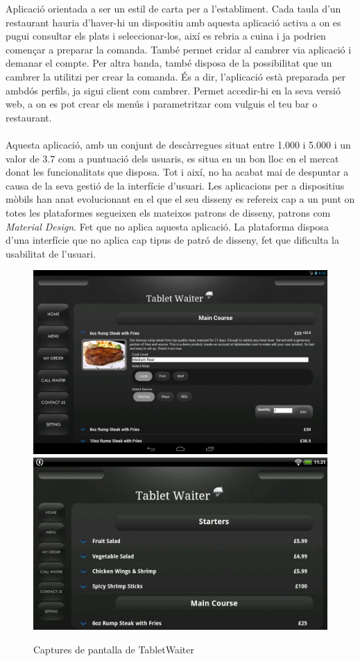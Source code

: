 Aplicació\cite{tabletwaiter} orientada a ser un estil de carta per a l'establiment. Cada taula d'un restaurant hauria d'haver-hi un dispositiu amb aquesta aplicació activa a on es pugui consultar els plats i seleccionar-los, així es rebria a cuina i ja podrien començar a preparar la comanda. També permet cridar al cambrer via aplicació i demanar el compte. Per altra banda, també disposa de la possibilitat que un cambrer la utilitzi per crear la comanda. És a dir, l'aplicació està preparada per ambdós perfils, ja sigui client com cambrer. Permet accedir-hi en la seva versió web, a on es pot crear els menús i parametritzar com vulguis el teu bar o restaurant.
\\\\
Aquesta aplicació, amb un conjunt de descàrregues situat entre 1.000 i 5.000 i un valor de 3.7 com a puntuació dels usuaris, es situa en un bon lloc en el mercat donat les funcionalitats que disposa. Tot i així, no ha acabat mai de despuntar a causa de la seva gestió de la interfície d'usuari. Les aplicacions per a dispositius mòbils han anat evolucionant en el que el seu disseny es refereix cap a un punt on totes les plataformes segueixen els mateixos patrons de disseny, patrons com \textit{Material Design}\cite{materialdesign}. Fet que no aplica aquesta aplicació. La plataforma disposa d'una interfície que no aplica cap tipus de patró de disseny, fet que dificulta la usabilitat de l'usuari.
\\
\begin{figure}[H]
\centering
\includegraphics[scale=0.15]{Figures/tabletwaiter-1.png}
\includegraphics[scale=0.20]{Figures/tabletwaiter-2.png}
\caption{Captures de pantalla de TabletWaiter}
\end{figure}

